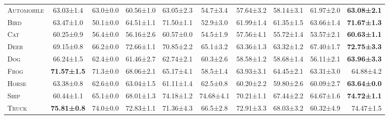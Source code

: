 \begin{table}[!t]
\begin{tabular}{lccccccccr}
   \textsc{Automobile}  & 63.03±1.4 & 63.0±0.0 & 60.56±1.0  &63.05±2.3& 54.7±3.4 & 57.64±3.2 & 58.14±3.1 & \color[rgb]{0,0,1}61.97±2.0  & \bf{63.08±2.1}\\
   \textsc{Bird}        & 63.47±1.0 & 50.1±0.0 & 64.51±1.1  &71.50±1.1& 52.9±3.0 & 61.99±1.4 & 61.35±1.5 & \color[rgb]{0,0,1} {63.66±1.4} & \bf{71.67±1.3}\\
   \textsc{Cat}         & 60.25±0.9 & 56.4±0.0 & 56.16±2.6  &60.57±0.0& 54.5±1.9 & 57.56±4.1 & 55.72±1.4 & 53.57±2.1  & \bf{60.63±1.1}\\
  \textsc{Deer}         & 69.15±0.8 & 66.2±0.0 & 72.66±1.1  &70.85±2.2& 65.1±3.2 & 63.36±1.3 & 63.32±1.2 & \color[rgb]{0,0,1}67.40±1.7  & \bf{72.75±3.3}\\
   \textsc{Dog}         & 66.24±1.5 & 62.4±0.0 & 61.46±2.7  &62.74±2.1& 60.3±2.6 & 58.58±1.2 & 58.68±1.4 & 56.11±2.1  & \bf{63.96±3.3}\\
   \textsc{Frog}        & \bf{71.57±1.5} & {71.3±0.0} & 68.06±2.1  &65.17±4.1& 58.5±1.4 & 63.93±3.1 & 64.45±2.1 & 63.31±3.0  & {64.88±4.2}\\
   \textsc{Horse}       & 63.38±0.8 & 62.6±0.0 & 63.04±1.5  &61.11±1.4& 62.5±0.8 & 60.20±2.2 & 59.80±2.6 & 60.09±2.7  &
   \bf{63.64±0.0}\\
  \textsc{Ship}         & 60.44±1.1 & {65.1±0.0} & 68.01±1.3  &74.18±1.2& 74.68±4.1 & 70.21±1.1 & 67.44±2.2 & 64.67±1.6  & \bf{74.72±1.1}\\
  \textsc{Truck}        & \bf{75.81±0.8} & {74.0±0.0} & 72.83±1.1  &71.36±4.3& 66.5±2.8 & 72.91±3.3 & 68.03±3.2 & 60.32±4.9  & {74.47±1.5}\\
   \bottomrule[\heavyrulewidth]
   \end{tabular}
\end{table}



